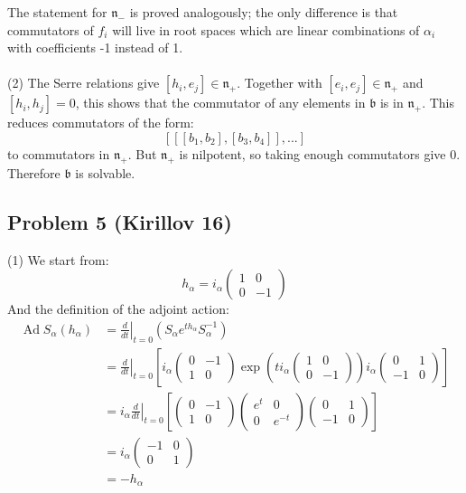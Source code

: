 \documentclass[12 pt]{article}
\newcommand{\fr}{\mathfrak}
\DeclareMathOperator {\Ad} {Ad}
\begin{document}
The statement for $\fr n_-$ is proved analogously; the only difference is that commutators of $f_i$ will live in root spaces which are linear combinations of $\alpha_i$ with coefficients -1 instead of 1.
\\
\\
(2) The Serre relations give $[h_i , e_j] \in \fr n_{+}$. Together with $[e_i, e_j] \in \fr n_{+}$ and $[h_i, h_j] = 0$, this shows that the commutator of any elements in $\fr b$ is in $\fr n_{+}$. This reduces commutators of the form:
\[      [ [ [b_1, b_2] , [b_3, b_4] ] , ...]          \]
to commutators in $\fr n_{+}$. But $\fr n_{+}$ is nilpotent, so taking enough commutators give 0. Therefore $\fr b$ is solvable.

\subsection*{Problem 5 (Kirillov 16)}
(1) We start from:
\[     h_{\alpha} = i_{\alpha} \left( \begin{array} {cc}  1 & 0 \\ 0 & -1   \end{array} \right)     \]
And the definition of the adjoint action:
\begin{align*}
\Ad S_{\alpha} (h_{\alpha}) &= \left. \frac{d}{dt} \right|_{t=0}  \left( S_{\alpha} e^{th_{\alpha}} S^{-1}_{\alpha}  \right)     \\
&= \left. \frac{d}{dt} \right|_{t=0}  \left[ i_{\alpha}\left( \begin{array} {cc}  0 & -1 \\ 1 & 0   \end{array} \right)   \exp\left( t  i_{\alpha} \left( \begin{array} {cc}  1 & 0 \\ 0 & -1   \end{array} \right) \right)   i_{\alpha}\left( \begin{array} {cc}  0 & 1 \\ -1 & 0   \end{array} \right)  \right] \\
&= i_{\alpha} \left. \frac{d}{dt} \right|_{t=0}  \left[  \left( \begin{array} {cc}  0 & -1 \\ 1 & 0   \end{array} \right)   \left( \begin{array} {cc}  e^{t} & 0 \\ 0 & e^{-t}   \end{array} \right)  \left( \begin{array} {cc}  0 & 1 \\ -1 & 0   \end{array} \right)  \right] \\
&= i_{\alpha} \left( \begin{array} {cc}  -1 & 0 \\ 0 & 1   \end{array} \right) \\
&= - h_{\alpha}
\end{align*}
\end{document}
